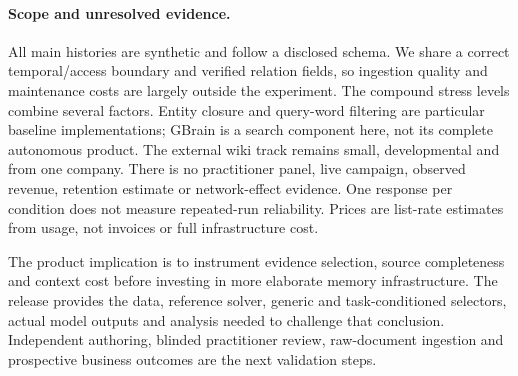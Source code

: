 \paragraph{Scope and unresolved evidence.}
All main histories are synthetic and follow a disclosed schema. We share a correct temporal/access boundary and verified relation fields, so ingestion quality and maintenance costs are largely outside the experiment. The compound stress levels combine several factors. Entity closure and query-word filtering are particular baseline implementations; GBrain is a search component here, not its complete autonomous product. The external wiki track remains small, developmental and from one company. There is no practitioner panel, live campaign, observed revenue, retention estimate or network-effect evidence. One response per condition does not measure repeated-run reliability. Prices are list-rate estimates from usage, not invoices or full infrastructure cost.

The product implication is to instrument evidence selection, source completeness and context cost before investing in more elaborate memory infrastructure. The release provides the data, reference solver, generic and task-conditioned selectors, actual model outputs and analysis needed to challenge that conclusion. Independent authoring, blinded practitioner review, raw-document ingestion and prospective business outcomes are the next validation steps.
